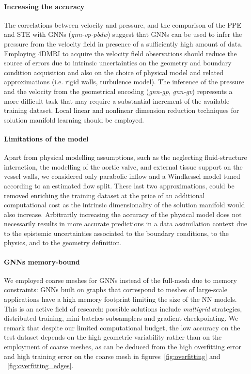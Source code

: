 \paragraph{Increasing the accuracy}
The correlations between velocity and pressure, and the comparison of the PPE and STE with GNNs (\textit{gnn-vp-pbdw}) suggest that GNNs can be used to infer the pressure from the velocity field in presence of a sufficiently high amount of data. Employing 4DMRI to acquire the velocity field observations should reduce the source of errors due to intrinsic uncertainties on the geometry and 
boundary condition acquisition and also on the choice of physical model and related approximations (i.e. rigid walls, turbulence model). The inference of the pressure and the velocity from the geometrical encoding (\textit{gnn-gp}, \textit{gnn-gv}) represents a more difficult task that may require a substantial increment of the available training dataset. Local linear and nonlinear dimension reduction techniques for solution manifold learning should be employed.

\paragraph{Limitations of the model} Apart from physical modelling assumptions, such as the neglecting fluid-structure interaction, the modelling of the aortic valve, and external tissue support on the vessel walls, we considered only parabolic inflow and a Windkessel model tuned according to an estimated flow split. These last two approximations, could be removed enriching the training dataset at the price of an additional computational cost as the intrinsic dimensionality of the solution manifold would also increase. Arbitrarily increasing the accuracy of the physical model does not necessarily results in more accurate predictions in a data assimilation context due to the epistemic uncertainties associated to the boundary conditions, to the physics, and to the geometry definition.

\paragraph{GNNs memory-bound} We employed coarse meshes for GNNs instead of the full-mesh due to memory constraints: GNNs built on graphs that correspond to meshes of large-scale applications have a high memory footprint limiting the size of the NN models. This is an active field of research: possible solutions include \textit{multigrid} strategies, distributed training, mini-batches subsamplers and gradient checkpointing. We remark that despite our limited computational budget, the low accuracy on the test dataset depends on the high geometric variability rather than on the employment of coarse meshes, as can be deduced from the high overfitting error and high training error on the coarse mesh in figures~\ref{fig:overfitting} and ~\ref{fig:overfitting_edges}.
